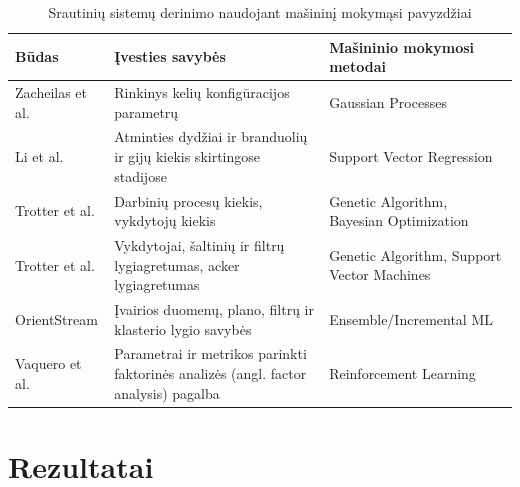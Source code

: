 \documentclass{VUMIFPSbakalaurinis}
\begin{document}
\begin{table}[H]
    \begin{tabular}{|l|p{}|p{}|}
    \hline
    Būdas                                           & Įvesties savybės                                                                    & Mašininio mokymosi metodai                 \\ \hline
    Zacheilas et al. \cite{zacheilas2015elastic}    & Rinkinys kelių konfigūracijos parametrų                                             & Gaussian Processes                         \\ \hline
    Li et al. \cite{li2016performance}              & Atminties dydžiai ir branduolių ir gijų kiekis skirtingose stadijose                & Support Vector Regression                  \\ \hline
    Trotter et al. \cite{Trotter2017Into}           & Darbinių procesų kiekis, vykdytojų kiekis                                           & Genetic Algorithm, Bayesian Optimization   \\ \hline
    Trotter et al. \cite{trotter2019forecasting}    & Vykdytojai, šaltinių ir filtrų lygiagretumas, acker lygiagretumas                   & Genetic Algorithm, Support Vector Machines \\ \hline
    OrientStream \cite{wang2017automating}          & Įvairios duomenų, plano, filtrų ir klasterio lygio savybės                          & Ensemble/Incremental ML                    \\ \hline
    Vaquero et al. \cite{vaquero2018autotuning}     & Parametrai ir metrikos parinkti faktorinės analizės (angl. factor analysis) pagalba & Reinforcement Learning                     \\ \hline
    \end{tabular}
    \caption{Srautinių sistemų derinimo naudojant mašininį mokymąsi pavyzdžiai \cite{herodotou2020survey}}
    \label{ml-in-stream}
    \end{table}


    \section{Rezultatai}
\printbibliography[heading=bibintoc] 
\end{document}
